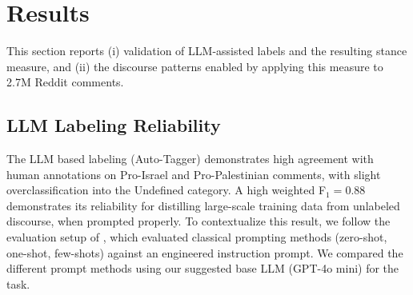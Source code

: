 \documentclass[letterpaper]{article} %
\begin{document}
\begin{table}[t]
\centering
\caption{Class distribution in the gold labels (test subset) and GPT-labeled external Trump datasets.}
\label{tab:samples_per_class_trump}
\end{table}




\section{Results}\label{sec:results}

This section reports (i) validation of LLM-assisted labels and the resulting stance measure, and (ii) the discourse patterns enabled by applying this measure to 2.7M Reddit comments.

\subsection{LLM Labeling Reliability}

The LLM based labeling (Auto-Tagger) demonstrates high agreement with human annotations on Pro-Israel and Pro-Palestinian comments, with slight overclassification into the Undefined category. A high weighted F$_{1}=0.88$ demonstrates its reliability for distilling large-scale training data from unlabeled discourse, when prompted properly. To contextualize this result, we follow the evaluation setup of \cite{ali2025social}, which evaluated classical prompting methods (zero-shot, one-shot, few-shots) against an engineered instruction prompt. We compared the different prompt methods using our suggested base LLM (GPT-4o mini) for the task.

\begin{table}[t]
\centering
\caption{Auto-Tagger results on the gold test set.}
\label{tab:autotagger-results}
\end{table}
\end{document}
